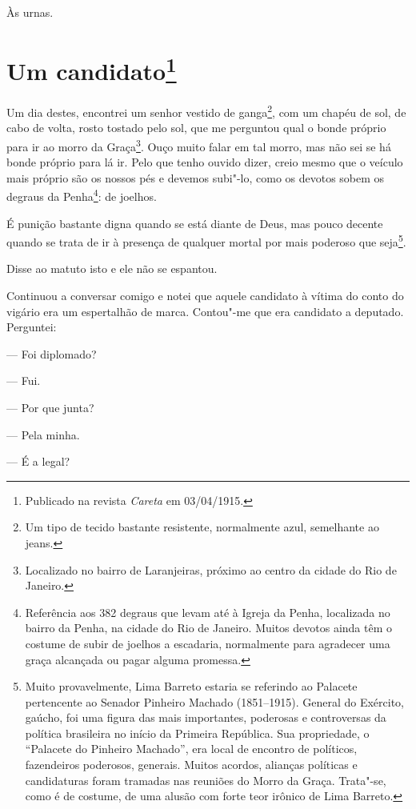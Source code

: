 Às urnas.


\chapter[Um candidato]{Um candidato\footnote[*]{Publicado na revista \emph{Careta} em 03/04/1915.}}

Um dia destes, encontrei um senhor vestido de ganga\footnote{Um tipo de
  tecido bastante resistente, normalmente azul, semelhante ao jeans.},
com um chapéu de sol, de cabo de volta, rosto tostado pelo sol, que me
perguntou qual o bonde próprio para ir ao morro da Graça\footnote{Localizado
  no bairro de Laranjeiras, próximo ao centro da cidade do Rio de
  Janeiro.}. Ouço muito falar em tal morro, mas não sei se há bonde
próprio para lá ir. Pelo que tenho ouvido dizer, creio mesmo que o
veículo mais próprio são os nossos pés e devemos subi"-lo, como os
devotos sobem os degraus da Penha\footnote{Referência aos 382 degraus
  que levam até à Igreja da Penha, localizada no bairro da Penha, na
  cidade do Rio de Janeiro. Muitos devotos ainda têm o costume de subir
  de joelhos a escadaria, normalmente para agradecer uma graça alcançada
  ou pagar alguma promessa.}: de joelhos.

É punição bastante digna quando se está diante de Deus, mas pouco
decente quando se trata de ir à presença de qualquer mortal por mais
poderoso que seja\footnote{Muito provavelmente, Lima Barreto estaria se
  referindo ao Palacete pertencente ao Senador Pinheiro Machado (1851--1915). General do Exército, gaúcho, foi uma figura das mais
  importantes, poderosas e controversas da política brasileira no início
  da Primeira República. Sua propriedade, o ``Palacete do Pinheiro
  Machado'', era local de encontro de políticos, fazendeiros poderosos,
  generais. Muitos acordos, alianças políticas e candidaturas foram
  tramadas nas reuniões do Morro da Graça. Trata"-se, como é de costume,
  de uma alusão com forte teor irônico de Lima Barreto.}.

Disse ao matuto isto e ele não se espantou.

Continuou a conversar comigo e notei que aquele candidato à vítima do
conto do vigário era um espertalhão de marca. Contou"-me que era
candidato a deputado. Perguntei:

--- Foi diplomado?

--- Fui.

--- Por que junta?

--- Pela minha.

--- É a legal?

